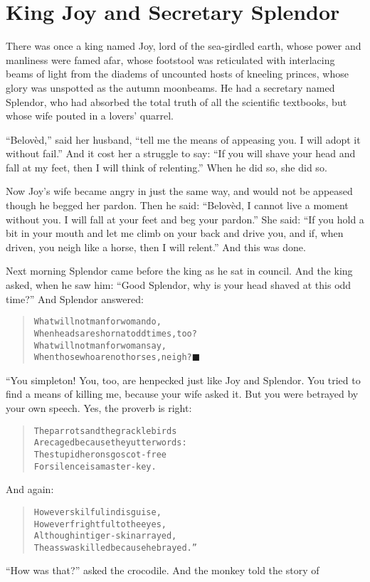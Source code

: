 \documentclass[article, twoside, 14pt]{memoir}
\newcommand{\qed}{\hfill \ensuremath{\blacksquare}}
\renewenvironment{verbatim}{%
\begin{quote}%
\vskip -10pt%
\begin{alltt}\normalfont\large}{\end{alltt}%
\end{quote}%
\vskip -10pt
} %
\begin{document}
\chapter{King Joy and Secretary Splendor}

\label{s72}

There was once a king named Joy, lord of the sea-girdled earth,
whose power and manliness were famed afar, whose footstool was
reticulated with interlacing beams of light from the diadems of
uncounted hosts of kneeling princes, whose glory was unspotted as
the autumn moonbeams. He had a secretary named Splendor, who had
absorbed the total truth of all the scientific textbooks, but whose
wife pouted in a lovers' quarrel.

``Belovèd,'' said her husband,
``tell me the means of appeasing you. I will adopt it without fail.''
And it cost her a struggle to say:
``If you will shave your head and fall at my feet, then I will think of relenting.''
When he did so, she did so.

Now Joy's wife became angry in just the same way, and would
not be appeased though he begged her pardon. Then he said:
``Belovèd, I cannot live a moment without you. I will fall at your feet and beg your pardon.''
She said:
``If you hold a bit in your mouth and let me climb on your back and drive you, and if, when driven, you neigh like a horse, then I will relent.''
And this was done.

Next morning Splendor came before the king as he sat in council.
And the king asked, when he saw him:
``Good Splendor, why is your head shaved at this odd time?'' And
Splendor answered:

\begin{verbatim}
What will not man for woman do,
When heads are shorn{\textemdash}at odd times, too?
What will not man for woman say,
When those who are not horses, neigh?\hyperref[s72]{\qed}
\end{verbatim}
“You simpleton! You, too, are henpecked just like Joy and Splendor.
You tried to find a means of killing me, because your wife asked
it. But you were betrayed by your own speech. Yes, the proverb is
right:

\begin{verbatim}
The parrots and the grackle birds
Are caged because they utter words:
The stupid herons go scot-free{\textemdash}
For silence is a master-key.
\end{verbatim}
And again:

\begin{verbatim}
However skilful in disguise,
However frightful to the eyes,
Although in tiger-skin arrayed,
The ass was killed{\textemdash}because he brayed.”
\end{verbatim}
``How was that?'' asked the crocodile. And the monkey told the
story of
\end{document}
